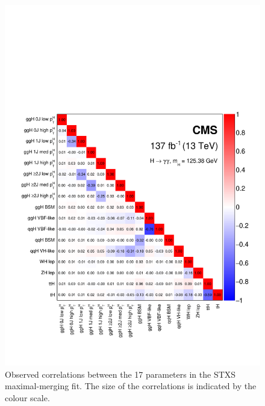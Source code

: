 \begin{figure}
  \centering
  \includegraphics[width=.9\textwidth]{Figures/hgg_results/stage1p2_maximal_correlations.pdf}
  \vspace{-.5cm}
  \caption[Correlations in the maximal-merging parameters]
  {
    Observed correlations between the 17 parameters in the STXS maximal-merging fit. The size of the correlations is indicated by the colour scale.
  }
  \label{fig:stage1p2_maximal_correlations}
\end{figure}

